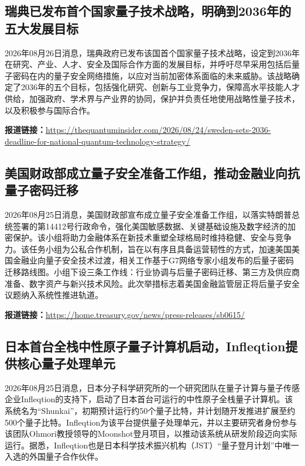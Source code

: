 \documentclass[12pt,a4paper]{ctexart}
\begin{document}
\subsection{ 瑞典已发布首个国家量子技术战略，明确到2036年的五大发展目标 }

2026年08月26日消息，瑞典政府已发布该国首个国家量子技术战略，设定到2036年在研究、产业、人才、安全及国际合作方面的发展目标，并呼吁尽早采用包括后量子密码在内的量子安全网络措施，以应对当前加密体系面临的未来威胁。该战略确定了2036年的五个目标，包括强化研究、创新与工业竞争力，保障高水平技能人才供给，加强政府、学术界与产业界的协同，保护并负责任地使用战略性量子技术，以及积极参与国际合作。

\noindent\textbf{报道链接：}\url{https://thequantuminsider.com/2026/08/24/sweden-sets-2036-deadline-for-national-quantum-technology-strategy/}

\subsection{ 美国财政部成立量子安全准备工作组，推动金融业向抗量子密码迁移 }

2026年08月25日消息，美国财政部宣布成立量子安全准备工作组，以落实特朗普总统签署的第14412号行政命令，强化美国敏感数据、关键基础设施及数字经济的加密保护。该小组将助力金融体系在新技术重塑全球格局时维持稳健、安全与竞争力。该任务小组为公私合作机制，旨在以有序且具备运营韧性的方式，加速美国美国金融业向量子安全技术过渡，相关工作基于G7网络专家小组发布的后量子密码迁移路线图。小组下设三条工作线：行业协调与后量子密码迁移、第三方及供应商准备、数字资产与新兴技术风险。此次举措标志着美国金融监管层正将后量子安全议题纳入系统性推进轨道。

\noindent\textbf{报道链接：}\url{https://home.treasury.gov/news/press-releases/sb0615/}

\subsection{ 日本首台全栈中性原子量子计算机启动，Infleqtion提供核心量子处理单元 }

2026年08月25日消息，日本分子科学研究所的一个研究团队在量子计算与量子传感企业Infleqtion的支持下，启动了日本首台可运行的中性原子全栈量子计算机。该系统名为“Shunkai”，初期预计运行约50个量子比特，并计划随开发推进扩展至约500个量子比特。Infleqtion为该平台提供量子处理单元，并以主要研究者身份参与该团队Ohmori教授领导的Moonshot登月项目，以推动该系统从研发阶段迈向实际运行。据悉，Infleqtion也是日本科学技术振兴机构（JST）“量子登月计划”中唯一入选的外国量子合作伙伴。
\end{document}
